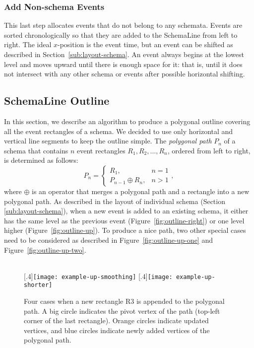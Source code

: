 \subsubsection{Add Non-schema Events}
\label{sub:layout-non-schema}
This last step allocates events that do not belong to any schemata. Events are sorted chronologically so that they are added to the SchemaLine from left to right. The ideal $x$-position is the event time, but an event can be shifted as described in Section~\ref{sub:layout-schema}. An event always begins at the lowest level and moves upward until there is enough space for it: that is, until it does not intersect with any other schema or events after possible horizontal shifting. 

\subsection{SchemaLine Outline}
\label{sub:schema-outline}
In this section, we describe an algorithm to produce a polygonal outline covering all the event rectangles of a schema. We decided to use only horizontal and vertical line segments to keep the outline simple. The \emph{polygonal path} $P_n$ of a schema that contains $n$ event rectangles $R_1, R_2, ..., R_n$, ordered from left to right, is determined as follows:
\[
P_n=
\begin{cases}
R_1, & n=1 \\
P_{n-1} \oplus R_n, & n > 1
\end{cases},
\]
where $\oplus$ is an operator that merges a polygonal path and a rectangle into a new polygonal path. As described in the layout of individual schema (Section \ref{sub:layout-schema}), when a new event is added to an existing schema, it either has the same level as the previous event (Figure~\ref{fig:outline-right}) or one level higher (Figure~\ref{fig:outline-up}). To produce a nice path, two other special cases need to be considered as described in Figure~\ref{fig:outline-up-one} and Figure~\ref{fig:outline-up-two}.

\begin{figure}[ht]
	\centering
	\hfill
	\\
	[.4\linewidth]{\texttt{[image: example-up-smoothing]}}
	\hfill
	[.4\linewidth]{\texttt{[image: example-up-shorter]}}
	\caption{Four cases when a new rectangle \textrm{R3} is appended to the polygonal path. A big circle indicates the pivot vertex of the path (top-left corner of the last rectangle). Orange circles indicate updated vertices, and blue circles indicate newly added vertices of the polygonal path.}
	\label{fig:outline}
\end{figure}


